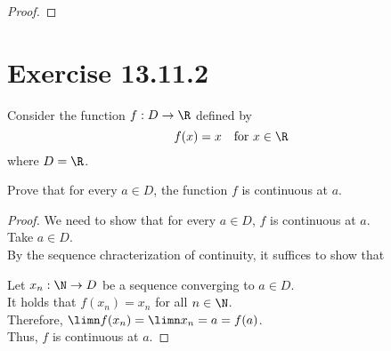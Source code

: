 \documentclass{assignment}
\begin{document}
\begin{proof}


\end{proof}

\section{Exercise 13.11.2}
\begin{problem}
    Consider the function $f: D \to \R$ defined by
    $$f(x) = x \quad \text{for } x \in \R$$
    where $D = \R$. 

    Prove that for every $a \in D$, the function $f$ is continuous at $a$.
\end{problem}
\begin{proof}
    We need to show that for every $a \in D$, $f$ is continuous at $a$. \\ 
    Take $a \in D$. \\
    By the sequence chracterization of continuity, it suffices to show that
    \begin{myCenter}
    \end{myCenter}
    Let $x_n: \N \to D$ be a sequence converging to $a \in D$. \\
    It holds that $f(x_n) = x_n$ for all $n \in \N$. \\
    Therefore, $\limn f(x_n) = \limn x_n = a = f(a)$. \\
    Thus, $f$ is continuous at $a$.

\end{proof}
\end{document}
